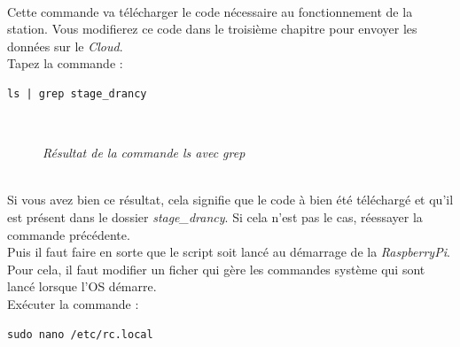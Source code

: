 \\
Cette commande va télécharger le code nécessaire au fonctionnement de la station. Vous modifierez ce code dans le troisième chapitre pour envoyer les données sur le \textit{Cloud}.
\\

Tapez la commande :\\

\begin{lstlisting}[style=MyBashStyle]
	ls | grep stage_drancy
\end{lstlisting}\\

\begin{figure}[H]
\begin{center}
\end{center}
	\caption{ \textit{Résultat de la commande ls avec grep}}
\end{figure}\\ 

Si vous avez bien ce résultat, cela signifie que le code à bien été téléchargé et qu'il est présent dans le dossier \textit{stage_drancy}. Si cela n'est pas le cas, réessayer la commande précédente.\\

Puis il faut faire en sorte que le script soit lancé au démarrage de la \textit{RaspberryPi}. Pour cela, il faut modifier un ficher qui gère les commandes système qui sont lancé lorsque l'OS démarre.\\

Exécuter la commande : \\

\begin{lstlisting}[style=MyBashStyle]
	sudo nano /etc/rc.local
\end{lstlisting}\\


